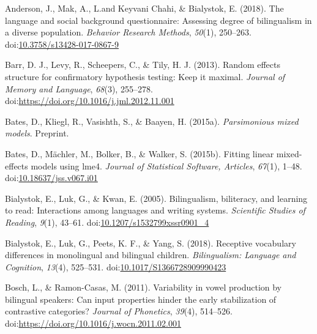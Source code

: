 \documentclass[,man,floatsintext]{apa6}
\begin{document}
\begingroup
\setlength{\parindent}{-0.5in}
\setlength{\leftskip}{0.5in}

\hypertarget{refs}{}
\leavevmode\hypertarget{ref-anderson_2018}{}%
Anderson, J., Mak, A., L.and Keyvani Chahi, \& Bialystok, E. (2018). The language and social background questionnaire: Assessing degree of bilingualism in a diverse population. \emph{Behavior Research Methods}, \emph{50}(1), 250--263. doi:\href{https://doi.org/10.3758/s13428-017-0867-9}{10.3758/s13428-017-0867-9}

\leavevmode\hypertarget{ref-barr_2013}{}%
Barr, D. J., Levy, R., Scheepers, C., \& Tily, H. J. (2013). Random effects structure for confirmatory hypothesis testing: Keep it maximal. \emph{Journal of Memory and Language}, \emph{68}(3), 255--278. doi:\href{https://doi.org/https://doi.org/10.1016/j.jml.2012.11.001}{https://doi.org/10.1016/j.jml.2012.11.001}

\leavevmode\hypertarget{ref-bates_2015a}{}%
Bates, D., Kliegl, R., Vasishth, S., \& Baayen, H. (2015a). \emph{Parsimonious mixed models}. Preprint.

\leavevmode\hypertarget{ref-bates_2015b}{}%
Bates, D., Mächler, M., Bolker, B., \& Walker, S. (2015b). Fitting linear mixed-effects models using lme4. \emph{Journal of Statistical Software, Articles}, \emph{67}(1), 1--48. doi:\href{https://doi.org/10.18637/jss.v067.i01}{10.18637/jss.v067.i01}

\leavevmode\hypertarget{ref-bialystok_2005}{}%
Bialystok, E., Luk, G., \& Kwan, E. (2005). Bilingualism, biliteracy, and learning to read: Interactions among languages and writing systems. \emph{Scientific Studies of Reading}, \emph{9}(1), 43--61. doi:\href{https://doi.org/10.1207/s1532799xssr0901_4}{10.1207/s1532799xssr0901\_4}

\leavevmode\hypertarget{ref-bialystok_2018}{}%
Bialystok, E., Luk, G., Peets, K. F., \& Yang, S. (2018). Receptive vocabulary differences in monolingual and bilingual children. \emph{Bilingualism: Language and Cognition}, \emph{13}(4), 525--531. doi:\href{https://doi.org/10.1017/S1366728909990423}{10.1017/S1366728909990423}

\leavevmode\hypertarget{ref-bosch_2011}{}%
Bosch, L., \& Ramon-Casas, M. (2011). Variability in vowel production by bilingual speakers: Can input properties hinder the early stabilization of contrastive categories? \emph{Journal of Phonetics}, \emph{39}(4), 514--526. doi:\href{https://doi.org/https://doi.org/10.1016/j.wocn.2011.02.001}{https://doi.org/10.1016/j.wocn.2011.02.001}
\end{document}
